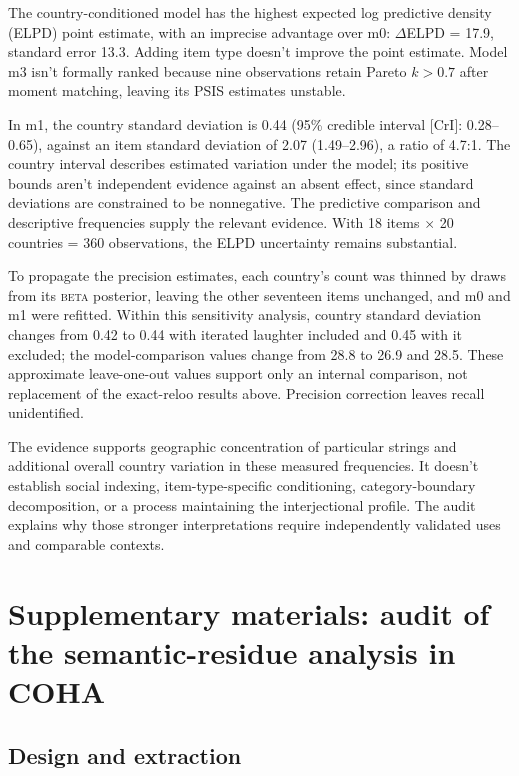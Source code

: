 \documentclass[12pt]{article}
\begin{document}
The country-conditioned model has the highest expected log predictive density (ELPD) point estimate, with an imprecise advantage over m0: $\Delta$ELPD = 17.9, standard error 13.3. Adding item type doesn't improve the point estimate. Model m3 isn't formally ranked because nine observations retain Pareto $k > 0.7$ after moment matching, leaving its PSIS estimates unstable.

In m1, the country standard deviation is 0.44 (95\% credible interval [CrI]: 0.28--0.65), against an item standard deviation of 2.07 (1.49--2.96), a ratio of 4.7:1. The country interval describes estimated variation under the model; its positive bounds aren't independent evidence against an absent effect, since standard deviations are constrained to be nonnegative. The predictive comparison and descriptive frequencies supply the relevant evidence. With 18 items $\times$ 20 countries = 360 observations, the ELPD uncertainty remains substantial.

To propagate the  precision estimates, each country's count was thinned by draws from its \textsc{beta} posterior, leaving the other seventeen items unchanged, and m0 and m1 were refitted. Within this sensitivity analysis, country standard deviation changes from 0.42 to 0.44 with iterated laughter included and 0.45 with it excluded; the model-comparison values change from 28.8 to 26.9 and 28.5. These approximate leave-one-out values support only an internal comparison, not replacement of the exact-reloo results above. Precision correction leaves recall unidentified.

The evidence supports geographic concentration of particular strings and additional overall country variation in these measured frequencies. It doesn't establish social indexing, item-type-specific conditioning, category-boundary decomposition, or a process maintaining the interjectional profile. The audit explains why those stronger interpretations require independently validated uses and comparable contexts.

\clearpage

\section[Semantic residue in COHA]{Supplementary materials: audit of the semantic-residue analysis in COHA}
\label{app:morphgain}

\subsection{Design and extraction}
\end{document}
